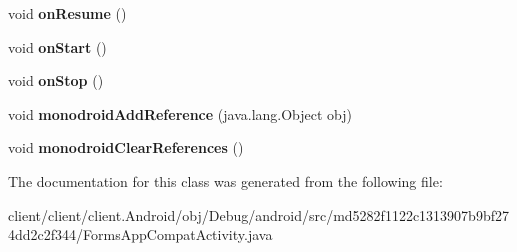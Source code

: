 \begin{DoxyCompactItemize}
\item 
\hypertarget{classmd5282f1122c1313907b9bf274dd2c2f344_1_1FormsAppCompatActivity_af5e371b451908e53771d02f759a3c1f7}{}void {\bfseries on\+Resume} ()\label{classmd5282f1122c1313907b9bf274dd2c2f344_1_1FormsAppCompatActivity_af5e371b451908e53771d02f759a3c1f7}

\item 
\hypertarget{classmd5282f1122c1313907b9bf274dd2c2f344_1_1FormsAppCompatActivity_abbfc2483bbce19fae96e1495ec27aa5f}{}void {\bfseries on\+Start} ()\label{classmd5282f1122c1313907b9bf274dd2c2f344_1_1FormsAppCompatActivity_abbfc2483bbce19fae96e1495ec27aa5f}

\item 
\hypertarget{classmd5282f1122c1313907b9bf274dd2c2f344_1_1FormsAppCompatActivity_a6b6ecdebb74940f503a69a34e886097f}{}void {\bfseries on\+Stop} ()\label{classmd5282f1122c1313907b9bf274dd2c2f344_1_1FormsAppCompatActivity_a6b6ecdebb74940f503a69a34e886097f}

\item 
\hypertarget{classmd5282f1122c1313907b9bf274dd2c2f344_1_1FormsAppCompatActivity_aa708edb0d5ad1bd6dd6cc2d3369246b5}{}void {\bfseries monodroid\+Add\+Reference} (java.\+lang.\+Object obj)\label{classmd5282f1122c1313907b9bf274dd2c2f344_1_1FormsAppCompatActivity_aa708edb0d5ad1bd6dd6cc2d3369246b5}

\item 
\hypertarget{classmd5282f1122c1313907b9bf274dd2c2f344_1_1FormsAppCompatActivity_a5aed1e610581d95c22232d0e3db33b58}{}void {\bfseries monodroid\+Clear\+References} ()\label{classmd5282f1122c1313907b9bf274dd2c2f344_1_1FormsAppCompatActivity_a5aed1e610581d95c22232d0e3db33b58}

\end{DoxyCompactItemize}


The documentation for this class was generated from the following file\+:\begin{DoxyCompactItemize}
\item 
client/client/client.\+Android/obj/\+Debug/android/src/md5282f1122c1313907b9bf274dd2c2f344/Forms\+App\+Compat\+Activity.\+java\end{DoxyCompactItemize}
